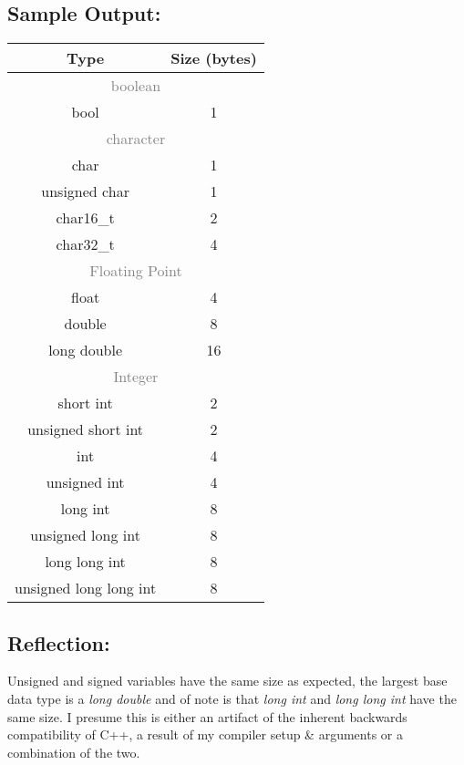\documentclass[main.tex]{subfiles}
\begin{document}
        \subsection*{Sample Output:}
            \begin{center}
                \begin{tabular}{c c}
                    \hline
                    \textbf{Type} & \textbf{Size (bytes)} \\
                    \hline
                    \multicolumn{2}{c}{\textcolor{gray}{boolean}} \\
                    bool & 1 \\
                    \multicolumn{2}{c}{\textcolor{gray}{character}} \\
                    char & 1 \\
                    unsigned char & 1 \\
                    char16\_t & 2 \\
                    char32\_t & 4 \\
                    \multicolumn{2}{c}{\textcolor{gray}{Floating Point}} \\
                    float & 4 \\
                    double & 8 \\
                    long double & 16 \\
                    \multicolumn{2}{c}{\textcolor{gray}{Integer}} \\
                    short int & 2 \\
                    unsigned short int & 2 \\
                    int & 4 \\
                    unsigned int & 4 \\
                    long int & 8 \\
                    unsigned long int & 8 \\
                    long long int & 8 \\
                    unsigned long long int & 8 \\
                \end{tabular}
            \end{center}

        \subsection*{Reflection:}
            Unsigned and signed variables have the same size as expected,
            the largest base data type is a \textit{long double} and of note is that
            \textit{long int} and \textit{long long int} have the same size.
            I presume this is either an artifact of the inherent backwards compatibility of C++,
            a result of my compiler setup \& arguments or a combination of the two. 
\end{document}
